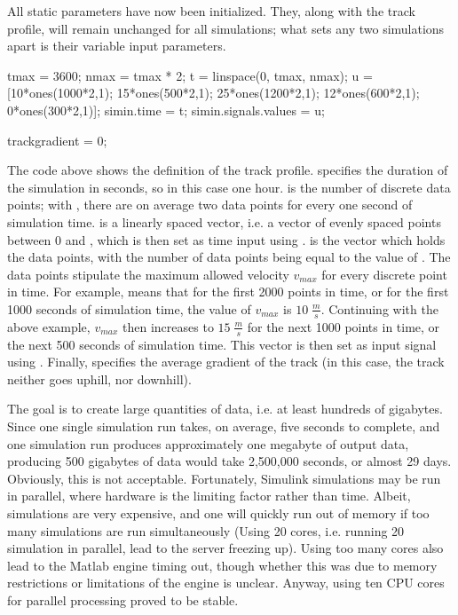 \noindent
\TODO{}
\par\noindent
All static parameters have now been initialized. They, along with the track profile, will remain unchanged for all simulations; what sets any two simulations apart is their variable input parameters.

\bigskip
\begin{python}
tmax = 3600;
nmax = tmax * 2;
t = linspace(0, tmax, nmax);
u = [10*ones(1000*2,1); 15*ones(500*2,1); 25*ones(1200*2,1); 12*ones(600*2,1); 0*ones(300*2,1)];
simin.time = t;
simin.signals.values = u;

trackgradient = 0;
\end{python}
\bigskip

\noindent
The code above shows the definition of the track profile.  specifies the duration of the simulation in seconds, so in this case one hour.  is the number of discrete data points; with , there are on average two data points for every one second of simulation time.  is a linearly spaced vector, i.e. a vector of  evenly spaced points between 0 and , which is then set as time input using .  is the vector which holds the data points, with the number of data points being equal to the value of . The data points stipulate the maximum allowed velocity $v_{max}$ for every discrete point in time. For example,  means that for the first 2000 points in time, or for the first 1000 seconds of simulation time, the value of $v_{max}$ is $10 \; \frac{m}{s}$. Continuing with the above example, $v_{max}$ then increases to $15 \; \frac{m}{s}$ for the next 1000 points in time, or the next 500 seconds of simulation time. This vector  is then set as input signal using . Finally,  specifies the average gradient of the track (in this case, the track neither goes uphill, nor downhill).
\par
The goal is to create large quantities of data, i.e. at least hundreds of gigabytes. Since one single simulation run takes, on average, five seconds to complete, and one simulation run produces approximately one megabyte of output data, producing 500 gigabytes of data would take 2,500,000 seconds, or almost 29 days. Obviously, this is not acceptable. Fortunately, Simulink simulations may be run in parallel, where hardware is the limiting factor rather than time. Albeit, simulations are very expensive, and one will quickly run out of memory if too many simulations are run simultaneously (Using 20 cores, i.e. running 20 simulation in parallel, lead to the server freezing up). Using too many cores also lead to the Matlab engine timing out, though whether this was due to memory restrictions or limitations of the engine is unclear. Anyway, using ten CPU cores for parallel processing proved to be stable.


